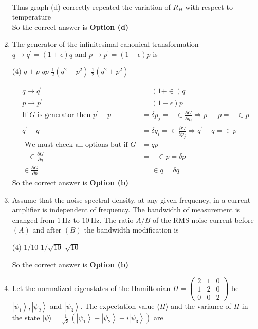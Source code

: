 \begin{enumerate}
\begin{answer}
\begin{align*}
	\end{align*}
	Thus graph
	(d) correctly repeated the variation of $R_{H}$ with respect to temperature\\
	So the correct answer is \textbf{Option (d)}
\end{answer}
\item The generator of the infinitesimal canonical transformation $q \rightarrow q^{\prime}=(1+\epsilon) q$ and $p \rightarrow p^{\prime}=(1-\epsilon) p$ is
 \begin{tasks}(4)
	\task[\textbf{a.}]$q+p$
	\task[\textbf{b.}]$q p$
	\task[\textbf{c.}]$\frac{1}{2}\left(q^{2}-p^{2}\right)$
	\task[\textbf{d.}] $\frac{1}{2}\left(q^{2}+p^{2}\right)$
\end{tasks}
\begin{answer}
	\begin{align*}
	q \rightarrow q^{\prime}&=(1+\in) q\\
	p \rightarrow p^{\prime}&=(1-\epsilon) p\\
	\text{If $G$ is generator then }
	p^{\prime}-p&=\delta p_{j}=-\in \frac{\partial G}{\partial q_{j}} \Rightarrow p^{\prime}-p=-\in p\\
	q^{\prime}-q&=\delta q_{i}=\in \frac{\partial G}{\partial p_{j}} \Rightarrow q^{\prime}-q=\in p\\
	\text { We must check all options but if } G&=q p\\
	-\in \frac{\partial G}{\partial q}&=-\in p=\delta p \\
	\in \frac{\partial G}{\partial p}&=\in q=\delta q
	\end{align*}
		So the correct answer is \textbf{Option (b)}
\end{answer}
\item Assume that the noise spectral density, at any given frequency, in a current amplifier is independent of frequency. The bandwidth of measurement is changed from $1 \mathrm{~Hz}$ to $10 \mathrm{~Hz}$. The ratio $A / B$ of the RMS noise current before $(A)$ and after $(B)$ the bandwidth modification is
 \begin{tasks}(4)
	\task[\textbf{a.}]$1 / 10$
	\task[\textbf{b.}] $1 / \sqrt{10}$
	\task[\textbf{c.}]$\sqrt{10}$
\end{tasks}
\begin{answer}
		So the correct answer is \textbf{Option (b)}
\end{answer}
\item Let the normalized eigenstates of the Hamiltonian $H=\left(\begin{array}{ccc}2 & 1 & 0 \\ 1 & 2 & 0 \\ 0 & 0 & 2\end{array}\right)$ be $\left|\psi_{1}\right\rangle,\left|\psi_{2}\right\rangle$ and $\left|\psi_{3}\right\rangle$. The expectation value $\langle H\rangle$ and the variance of $H$ in the state $|\psi\rangle=\frac{1}{\sqrt{3}}\left(\left|\psi_{1}\right\rangle+\left|\psi_{2}\right\rangle-i\left|\psi_{3}\right\rangle\right)$ are

\end{enumerate}
